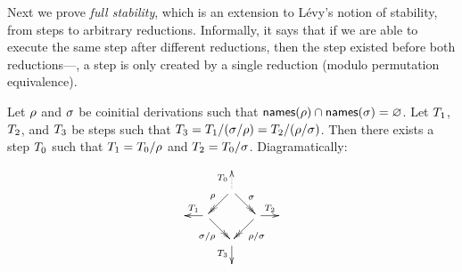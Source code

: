 Next we prove \emph{full stability}, which is an extension to Lévy's notion of
stability, from steps to arbitrary reductions. Informally, it says that if we are able
to execute the same step after different reductions, then the step existed before
both reductions---\ie, a step is only created by a single reduction (modulo permutation
equivalence).

\begin{lemma}
Let $\rho$ and $\sigma$ be coinitial derivations such that
$\mathsf{names}(\rho) \cap \mathsf{names}(\sigma) = \varnothing$.
Let $T_1$, $T_2$, and $T_3$
be steps such that
$T_3 = T_1/(\sigma/\rho) = T_2/(\rho/\sigma)$.
Then there exists a step $T_0$ such that
$T_1 = T_0/\rho$ and $T_2 = T_0/\sigma$.
Diagramatically:
\[
  \xymatrix@R=.5cm@C=.5cm{
    &&&
  \\
    &
    & \ar@{.>}[u]^{\redexthree_0} \ar@{->>}[ld]_{\redseq} \ar@{->>}[rd]^{\redseqtwo} &
  \\
    &
    \ar[l]_{\redexthree_1}
    \ar@{->>}[rd]_{\redseqtwo/\redseq} & & \ar@{->>}[ld]^{\redseq/\redseqtwo} \ar[r]^{\redexthree_2}
    &
  \\
    &
    &
    \ar[d]_{\redexthree_3}
    &
  \\
    &&&
  }
\]
\end{lemma}
